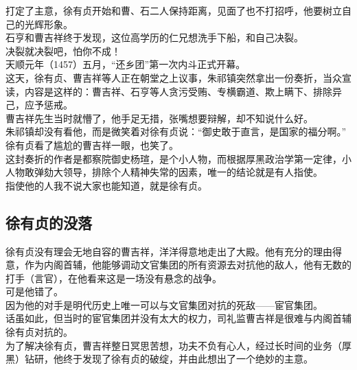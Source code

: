 \begin{multicols}{\theparacolNo}
打定了主意，徐有贞开始和曹、石二人保持距离，见面了也不打招呼，他要树立自己的光辉形象。\\

石亨和曹吉祥终于发现，这位高学历的仁兄想洗手下船，和自己决裂。\\

决裂就决裂吧，怕你不成！\\

天顺元年（1457）五月，“还乡团”第一次内斗正式开幕。\\

这天，徐有贞、曹吉祥等人正在朝堂之上议事，朱祁镇突然拿出一份奏折，当众宣读，内容是这样的：曹吉祥、石亨等人贪污受贿、专横霸道、欺上瞒下、排除异己，应予惩戒。\\

曹吉祥先生当时就懵了，他手足无措，张嘴想要辩解，却不知说什么好。\\

朱祁镇却没有看他，而是微笑着对徐有贞说：“御史敢于直言，是国家的福分啊。”\\

徐有贞看了尴尬的曹吉祥一眼，也笑了。\\

这封奏折的作者是都察院御史杨瑄，是个小人物，而根据厚黑政治学第一定律，小人物敢弹劾大领导，排除个人精神失常的因素，唯一的结论就是有人指使。\\

指使他的人我不说大家也能知道，就是徐有贞。\\

\subsection{徐有贞的没落}
徐有贞没有理会无地自容的曹吉祥，洋洋得意地走出了大殿。他有充分的理由得意，作为内阁首辅，他能够调动文官集团的所有资源去对抗他的敌人，他有无数的打手（言官），在他看来这是一场没有悬念的战争。\\

可是他错了。\\

因为他的对手是明代历史上唯一可以与文官集团对抗的死敌——宦官集团。\\

话虽如此，但当时的宦官集团并没有太大的权力，司礼监曹吉祥是很难与内阁首辅徐有贞对抗的。\\

为了解决徐有贞，曹吉祥整日冥思苦想，功夫不负有心人，经过长时间的业务（厚黑）钻研，他终于发现了徐有贞的破绽，并由此想出了一个绝妙的主意。\\


\end{multicols}
